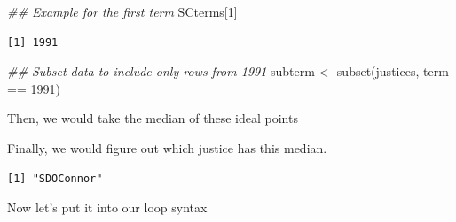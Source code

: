 \documentclass[
  letterpaper,
  DIV=11,
  numbers=noendperiod]{scrreprt}
\newenvironment{Shaded}{\begin{snugshade}}{\end{snugshade}}
\newcommand{\CommentTok}[1]{\textcolor[rgb]{0.37,0.37,0.37}{#1}}
\newcommand{\DecValTok}[1]{\textcolor[rgb]{0.68,0.00,0.00}{#1}}
\newcommand{\DocumentationTok}[1]{\textcolor[rgb]{0.37,0.37,0.37}{\textit{#1}}}
\newcommand{\FunctionTok}[1]{\textcolor[rgb]{0.28,0.35,0.67}{#1}}
\newcommand{\NormalTok}[1]{\textcolor[rgb]{0.00,0.23,0.31}{#1}}
\newcommand{\OtherTok}[1]{\textcolor[rgb]{0.00,0.23,0.31}{#1}}
\newcommand{\SpecialCharTok}[1]{\textcolor[rgb]{0.37,0.37,0.37}{#1}}
\begin{document}
\begin{Shaded}
\begin{Highlighting}[]
\DocumentationTok{\#\# Example for the first term}
\NormalTok{SCterms[}\DecValTok{1}\NormalTok{]}
\end{Highlighting}
\end{Shaded}

\begin{verbatim}
[1] 1991
\end{verbatim}

\begin{Shaded}
\begin{Highlighting}[]
\DocumentationTok{\#\# Subset data to include only rows from 1991}
\NormalTok{subterm }\OtherTok{\textless{}{-}} \FunctionTok{subset}\NormalTok{(justices, term }\SpecialCharTok{==} \DecValTok{1991}\NormalTok{)}
\end{Highlighting}
\end{Shaded}

Then, we would take the median of these ideal points

\begin{Shaded}
\end{Shaded}

Finally, we would figure out which justice has this median.

\begin{Shaded}
\end{Shaded}

\begin{verbatim}
[1] "SDOConnor"
\end{verbatim}

Now let's put it into our loop syntax

\begin{Shaded}
\end{Shaded}
\end{document}
